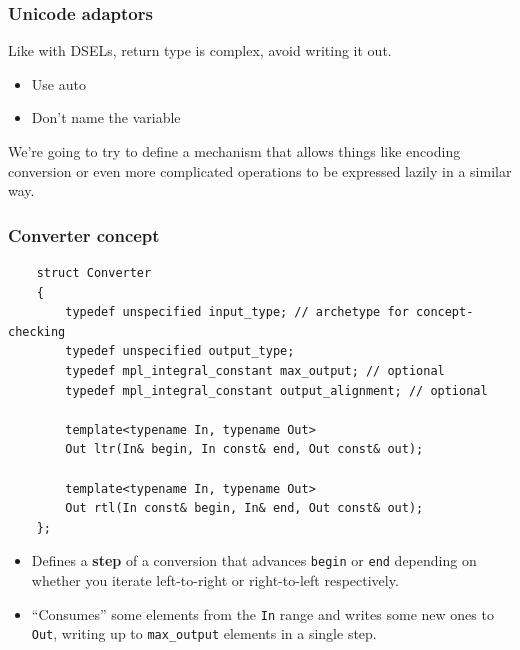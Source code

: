 \documentclass{beamer}
\begin{document}
\begin{frame}
	\frametitle{Unicode adaptors}
	
	Like with DSELs, return type is complex, avoid writing it out.
	\begin{itemize}
		\item Use auto
		\item Don't name the variable
	\end{itemize}
	\bigskip
	
	We're going to try to define a mechanism that allows things like encoding conversion or even more complicated operations to be expressed lazily in a similar way.
	
\end{frame}

\begin{frame}[fragile]
	\frametitle{Converter concept}
	
	\begin{lstlisting}
	struct Converter
	{
	    typedef unspecified input_type; // archetype for concept-checking
	    typedef unspecified output_type;
	    typedef mpl_integral_constant max_output; // optional
	    typedef mpl_integral_constant output_alignment; // optional
	
	    template<typename In, typename Out>
	    Out ltr(In& begin, In const& end, Out const& out);
	
	    template<typename In, typename Out>
	    Out rtl(In const& begin, In& end, Out const& out);		
	};
	\end{lstlisting}
	
	\small{
	\begin{itemize}
	\item Defines a \textbf{step} of a conversion that advances \lstinline{begin} or \lstinline{end}
	depending on whether you iterate left-to-right or right-to-left respectively.
	
	\item ``Consumes'' some elements from the \lstinline{In} range and writes some new ones to \lstinline{Out},
	writing up to \lstinline{max_output} elements in a single step.
	\end{itemize} }
	
\end{frame}
\end{document}
